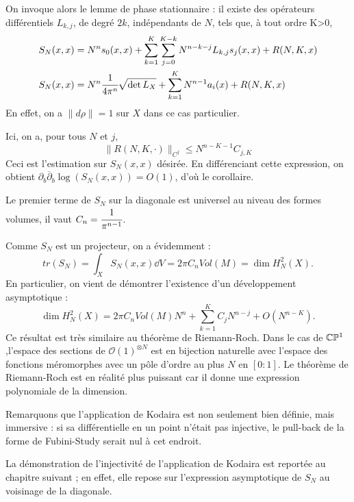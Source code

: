 On invoque alors le lemme de phase stationnaire : il existe des opérateurs différentiels $L_{k,j}$, de degré $2k$, indépendants de $N$, tels que, à tout ordre K>0, 
\begin{align*}
	S_N(x,x) &= N^n s_0(x,x) + \sum_{k=1}^{K}\sum_{j=0}^{K-k}N^{n-k-j}L_{k,j}s_j(x,x) + R(N,K,x)\\
		S_N(x,x) &= N^n \cfrac{1}{4\pi^n}\sqrt{\det{L_X}} + \sum_{k=1}^K N^{n-1}a_i(x) + R(N,K,x)
\end{align*}
En effet, on a $\|d\rho\|=1$ sur $X$ dans ce cas particulier.

Ici, on a, pour tous $N$ et $j$,
\begin{equation*}
  \|R(N,K,\cdot)\|_{C^j} \leq N^{n-K-1}C_{j,K}
\end{equation*}
Ceci est l'estimation sur $S_N(x,x)$ désirée. En différenciant cette expression, on obtient $\partial_b\overline{\partial}_b \log(S_N(x,x)) = O(1)$, d'où le corollaire.

\begin{rem}
	Le premier terme de $S_N$ sur la diagonale est universel au niveau des formes volumes, il vaut $C_n=\cfrac{1}{\pi^{n-1}}$.
\end{rem}
Comme $S_N$ est un projecteur, on a évidemment :
\begin{equation}
  tr(S_N) = \int_XS_N(x,x)\dd V=2\pi C_nVol(M)=\dim H^2_N(X).
\end{equation}
En particulier, on vient de démontrer l'existence d'un développement asymptotique :
\begin{equation}
  \dim H^2_N(X) = 2\pi C_n Vol(M)N^n+\sum_{k=1}^{K}C_jN^{n-j} + O(N^{n-K}).
\end{equation}
Ce résultat est très similaire au théorème de Riemann-Roch. Dans le cas de $\mathbb{C}\mathbb{P}^1$,l'espace des sections de $\mathcal{O}(1)^{\otimes N}$ est en bijection naturelle avec l'espace des fonctions méromorphes avec un pôle d'ordre au plus $N$ en $[0:1]$. Le théorème de Riemann-Roch est en réalité plus puissant car il donne une expression polynomiale de la dimension.

Remarquons que l'application de Kodaira est non seulement bien définie, mais immersive : si sa différentielle en un point n'était pas injective, le pull-back de la forme de Fubini-Study serait nul à cet endroit.

La démonstration de l'injectivité de l'application de Kodaira est
reportée au chapitre suivant ; en effet, elle repose sur l'expression
asymptotique de $S_N$ au voisinage de la diagonale.
